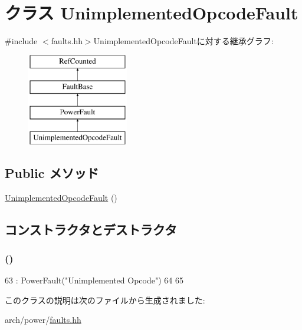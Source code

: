 \hypertarget{classPowerISA_1_1UnimplementedOpcodeFault}{
\section{クラス UnimplementedOpcodeFault}
\label{classPowerISA_1_1UnimplementedOpcodeFault}
}


{\ttfamily \#include $<$faults.hh$>$}UnimplementedOpcodeFaultに対する継承グラフ:\begin{figure}[H]
\begin{center}
\leavevmode
\includegraphics[height=4cm]{classPowerISA_1_1UnimplementedOpcodeFault}
\end{center}
\end{figure}
\subsection*{Public メソッド}
\begin{DoxyCompactItemize}
\item 
\hyperlink{classPowerISA_1_1UnimplementedOpcodeFault_a407e240f1129455beba4c466f91c5e2d}{UnimplementedOpcodeFault} ()
\end{DoxyCompactItemize}


\subsection{コンストラクタとデストラクタ}
\hypertarget{classPowerISA_1_1UnimplementedOpcodeFault_a407e240f1129455beba4c466f91c5e2d}{
\subsubsection[{UnimplementedOpcodeFault}]{ ()}}
\label{classPowerISA_1_1UnimplementedOpcodeFault_a407e240f1129455beba4c466f91c5e2d}



\begin{DoxyCode}
63         : PowerFault("Unimplemented Opcode")
64     {
65     }
\end{DoxyCode}


このクラスの説明は次のファイルから生成されました:\begin{DoxyCompactItemize}
\item 
arch/power/\hyperlink{arch_2power_2faults_8hh}{faults.hh}\end{DoxyCompactItemize}
